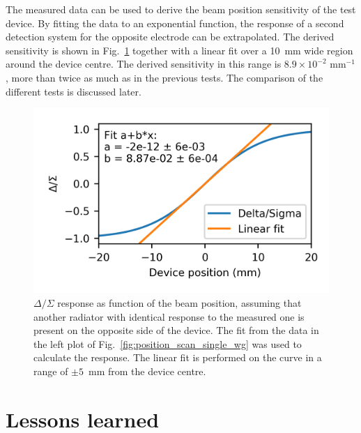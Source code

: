 The measured data can be used to derive the beam position sensitivity of the test device. By fitting the data to an exponential function, the response of a second detection system for the opposite electrode can be extrapolated. The derived sensitivity is shown in Fig.~\ref{fig:delta_sigma_single_wg} together with a linear fit over a 10~mm wide region around the device centre. The derived sensitivity in this range is $8.9 \times 10^{-2} \text{ mm}^{-1}$, more than  twice as much as in the previous tests. The comparison of the different tests is discussed later.

\begin{figure}[!h]
\centering

\vspace{5mm}
\centering
\includegraphics[scale=1, keepaspectratio]{pictures/delta_sigma_single_wg}
\caption{$\Delta/\Sigma$ response as function of the beam position, assuming that another radiator with identical response to the measured one is present on the opposite side of the device. The fit from the data in the left plot of Fig.~\ref{fig:position_scan_single_wg} was used to calculate the  response. The linear fit is performed on the curve in a range of $\pm5$~mm from the device centre.}
\label{fig:delta_sigma_single_wg}

\end{figure}









\section[Lessons learned]{Lessons learned}\label{sec:lesson_learned}

